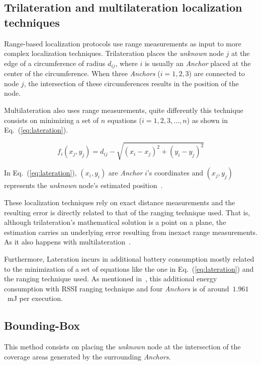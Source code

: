 \subsection{Trilateration and multilateration localization techniques} \label{lateration}
Range-based localization protocols use range measurements as input to more complex localization techniques. Trilateration places the \emph{unknown} node $j$ at the edge of a circumference of radius $d_{ij}$, where $i$ is usually an \emph{Anchor} placed at the center of the circumference. When three \emph{Anchors} ($i=1,2,3$) are connected to node $j$, the intersection of these circumferences results in the position of the node.

Multilateration also uses range measurements, quite differently this technique consists on minimizing a set of $n$ equations ($i=1,2,3,...,n$) as shown in Eq.~(\ref{eq:lateration}).

\begin{equation}\label{eq:lateration}
 f_{i}(x_{j},y_{j})=d_{ij}-\sqrt{(x_{i}-x_{j})^2+(y_{i}-y_{j})^2}
\end{equation}

In Eq.~(\ref{eq:lateration}), $(x_{i},y_{i})$ are \emph{Anchor} $i$'s coordinates and $(x_{j},y_{j})$ represents the \emph{unknown} node's estimated position~\cite{rang:loc:techniques}.

These localization techniques rely on exact distance measurements and the resulting error is directly related to that of the ranging technique used. That is, although trilateration's mathematical solution is a point on a plane, the estimation carries an underlying error resulting from inexact range measurements. As it also happens with multilateration~\cite{AkyildizWSNs}.

Furthermore, Lateration incurs in additional battery consumption mostly related to the minimization of a set of equations like the one in Eq.~(\ref{eq:lateration}) and the ranging technique used. As mentioned in~\cite{laterationSpecs}, this additional energy consumption with RSSI ranging technique and four \emph{Anchors} is of around~$1.961$~mJ per execution.

\subsection{Bounding-Box}
This method consists on placing the \emph{unknown} node at the intersection of the coverage areas generated by the surrounding \emph{Anchors}.

